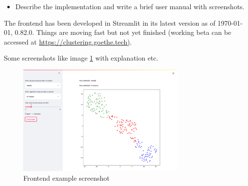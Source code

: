 \begin{itemize}
\item Describe the implementation and write a brief user manual with screenshots.
\end{itemize}

The frontend has been developed in Streamlit \cite{streamlit2018} in its latest version as of \today, 0.82.0. Things are moving fast but not yet finished (working beta can be accessed at \url{https://clustering.goethe.tech)}.

Some screenshots like image \ref{img:frontend_screenshot_1} with explanation etc. 
\begin{figure}[H]
\caption{Frontend example screenshot}
%
\begin{center}
\includegraphics[width=0.75\textwidth]{images/frontend_beta_001.png}
\end{center}
\label{img:frontend_screenshot_1}
\end{figure}